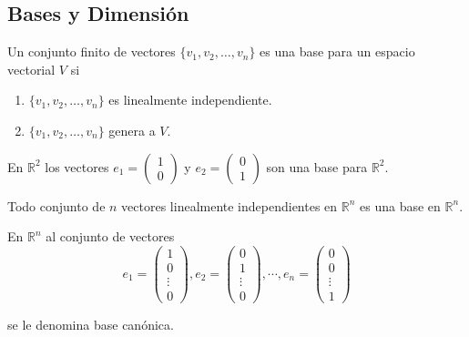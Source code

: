\subsection{Bases y Dimensión}

\begin{defin}
Un conjunto finito de vectores $\{ v_1,v_2, \dots, v_n \}$ es una base para un espacio vectorial $V$ si 

\begin{enumerate}
\item
$\{ v_1,v_2, \dots, v_n \}$ es linealmente independiente.

\item
$\{ v_1,v_2, \dots, v_n \}$ genera a $V$.
\end{enumerate}
\end{defin}

\begin{ejem}
En $\mathbb{R}^2$ los vectores $e_1 = \begin{pmatrix} 1 \\ 0  \end{pmatrix}$ y $e_2 = \begin{pmatrix} 0 \\ 1 \end{pmatrix}$ son una base para $\mathbb{R}^2$.
\end{ejem}

\begin{rmk}
Todo conjunto de $n$ vectores linealmente independientes en $\mathbb{R}^n$ es una base en $\mathbb{R}^n$.
\end{rmk}



\begin{defin}
En $\mathbb{R}^n$ al conjunto de vectores 
$$e_1 = \begin{pmatrix} 1 \\ 0 \\ \vdots \\ 0 \end{pmatrix}, e_2 = \begin{pmatrix} 0 \\ 1 \\ \vdots \\ 0 \end{pmatrix}, \cdots, e_n = \begin{pmatrix} 0 \\ 0 \\ \vdots \\ 1 \end{pmatrix}$$ 

se le denomina base canónica.
\end{defin}

